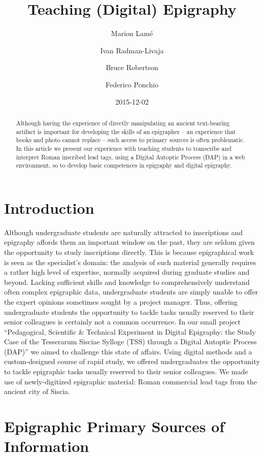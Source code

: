 \documentclass[amsthm,ebook]{saparticle}
\title{Teaching (Digital) Epigraphy}
\author[ilc]{Marion Lamé\corref{first}}
\author[zag]{Ivan Radman-Livaja}
\author[mau]{Bruce Robertson}
\author[isti]{Federico Ponchio}
\date{2015-12-02}
\begin{document}
\maketitle
\begin{abstract}
Although having the experience of directly manipulating an ancient text-bearing artifact is important for developing the
skills of an epigrapher – an experience that books and photo cannot replace – such access to primary sources is often
problematic. In this article we present our experience with teaching students to transcribe and interpret Roman
inscribed lead tags, using a Digital Autoptic Process (DAP) in a web environment, so to develop basic competences in
epigraphy and digital epigraphy.
\end{abstract}

\section{Introduction}

Although undergraduate students are naturally attracted to inscriptions and epigraphy affords them an important window
on the past, they are seldom given the opportunity to study inscriptions directly. This is because epigraphical work is
seen as the specialist’s domain: the analysis of such material generally requires a rather high level of expertise,
normally acquired during graduate studies and beyond. Lacking sufficient skills and knowledge to comprehensively
understand often complex epigraphic data, undergraduate students are simply unable to offer the expert opinions
sometimes sought by a project manager. Thus, offering undergraduate students the opportunity to tackle tasks usually
reserved to their senior colleagues is certainly not a common occurrence. In our small project ``Pedagogical,
Scientific \& Technical Experiment in Digital Epigraphy: the Study Case of the Tesserarum Sisciae Sylloge (TSS) through
a Digital Autoptic Process (DAP)'' we aimed to challenge this state of affairs. Using digital methods and a
custom-designed course of rapid study, we offered undergraduates the opportunity to tackle epigraphic tasks usually
reserved to their senior colleagues. We made use of newly-digitized epigraphic material: Roman commercial lead tags
from the ancient city of Siscia.

\section{Epigraphic Primary Sources of Information}
\end{document}
